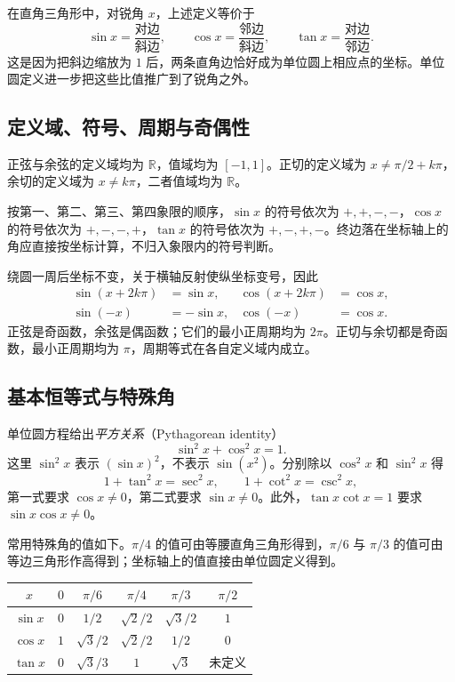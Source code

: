 \documentclass[UTF8,12pt,a4paper,fontset=fandol]{ctexart}
\begin{document}
在直角三角形中，对锐角 $x$，上述定义等价于
\[
  \sin x=\frac{\text{对边}}{\text{斜边}},\qquad
  \cos x=\frac{\text{邻边}}{\text{斜边}},\qquad
  \tan x=\frac{\text{对边}}{\text{邻边}}.
\]
这是因为把斜边缩放为 $1$ 后，两条直角边恰好成为单位圆上相应点的坐标。单位圆定义进一步把这些比值推广到了锐角之外。

\subsection{定义域、符号、周期与奇偶性}

正弦与余弦的定义域均为 $\mathbb R$，值域均为 $[-1,1]$。正切的定义域为 $x\ne\pi/2+k\pi$，余切的定义域为 $x\ne k\pi$，二者值域均为 $\mathbb R$。

按第一、第二、第三、第四象限的顺序，$\sin x$ 的符号依次为 $+,+,-,-$，$\cos x$ 的符号依次为 $+,-,-,+$，$\tan x$ 的符号依次为 $+,-,+,-$。终边落在坐标轴上的角应直接按坐标计算，不归入象限内的符号判断。

绕圆一周后坐标不变，关于横轴反射使纵坐标变号，因此
\begin{align}
  \sin(x+2k\pi)&=\sin x,&\cos(x+2k\pi)&=\cos x,
  \label{eq:trig-period}\\
  \sin(-x)&=-\sin x,&\cos(-x)&=\cos x.
  \label{eq:trig-parity}
\end{align}
正弦是奇函数，余弦是偶函数；它们的最小正周期均为 $2\pi$。正切与余切都是奇函数，最小正周期均为 $\pi$，周期等式在各自定义域内成立。

\subsection{基本恒等式与特殊角}

单位圆方程给出\emph{平方关系}（Pythagorean identity）
\begin{equation}\label{eq:trig-pythagorean}
  \boxed{\sin^2x+\cos^2x=1}.
\end{equation}
这里 $\sin^2x$ 表示 $(\sin x)^2$，不表示 $\sin(x^2)$。分别除以 $\cos^2x$ 和 $\sin^2x$ 得
\begin{equation}\label{eq:trig-sec-csc}
  1+\tan^2x=\sec^2x,\qquad
  1+\cot^2x=\csc^2x,
\end{equation}
第一式要求 $\cos x\ne0$，第二式要求 $\sin x\ne0$。此外，$\tan x\cot x=1$ 要求 $\sin x\cos x\ne0$。

常用特殊角的值如下。$\pi/4$ 的值可由等腰直角三角形得到，$\pi/6$ 与 $\pi/3$ 的值可由等边三角形作高得到；坐标轴上的值直接由单位圆定义得到。
\begin{center}
\begin{tabular}{c c c c c c}
\toprule
$x$ & $0$ & $\pi/6$ & $\pi/4$ & $\pi/3$ & $\pi/2$ \\
\midrule
$\sin x$ & $0$ & $1/2$ & $\sqrt2/2$ & $\sqrt3/2$ & $1$ \\
$\cos x$ & $1$ & $\sqrt3/2$ & $\sqrt2/2$ & $1/2$ & $0$ \\
$\tan x$ & $0$ & $\sqrt3/3$ & $1$ & $\sqrt3$ & 未定义 \\
\bottomrule
\end{tabular}
\end{center}
\end{document}
